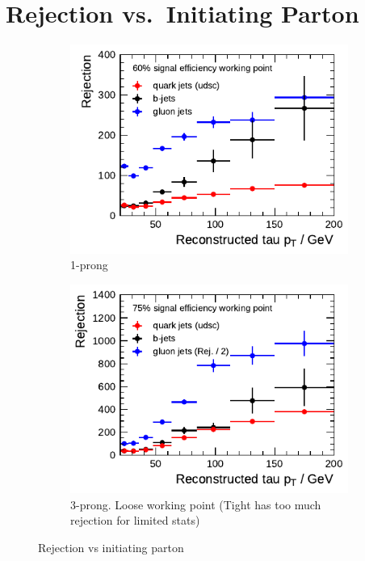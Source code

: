 \section{Rejection vs.\ Initiating Parton}
\begin{figure}[htb]
  \centering
  \begin{subfigure}[t]{0.48\textwidth}
    \centering
    \includegraphics{./figures/bdt_perf/parton/truth_parton_1p.pdf}
    \caption{1-prong}
  \end{subfigure}\hfill
  \begin{subfigure}[t]{0.48\textwidth}
    \centering
    \includegraphics{./figures/bdt_perf/parton/truth_parton_3p.pdf}
    \caption{3-prong. Loose working point (Tight has too much rejection for
      limited stats)}
  \end{subfigure}
  \caption{Rejection vs initiating parton}
\end{figure}

